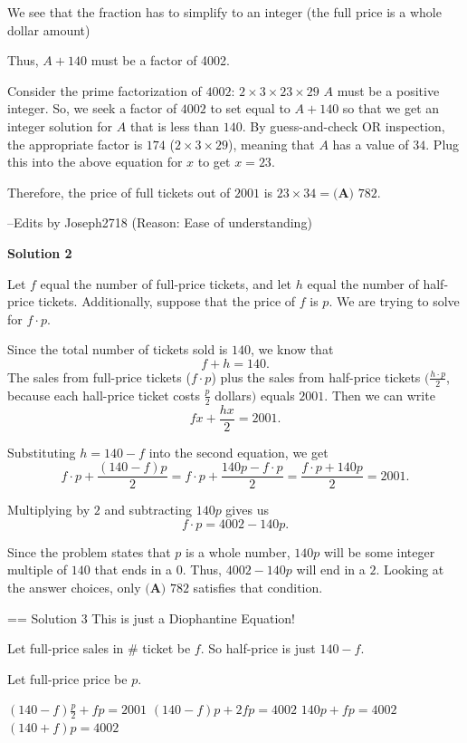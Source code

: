 \begin{enumerate}
 We see that the fraction has to simplify to an integer (the full price is a whole dollar amount)

 Thus, $A+140$ must be a factor of 4002.

 Consider the prime factorization of $4002$: $2\times3\times23\times29$
$A$ must be a positive integer. So, we seek a factor of $4002$ to set equal to $A+140$ so that we get an integer solution for $A$ that is less than $140$. By guess-and-check OR inspection, the appropriate factor is $174$ ($2\times3\times29$), meaning that $A$ has a value of $34$. Plug this into the above equation for $x$ to get $x = 23$.

 Therefore, the price of full tickets out of $2001$ is $23\times34=\boxed{\textbf{(A) }782}$.

 --Edits by Joseph2718 (Reason: Ease of understanding)

 



\textbf{Solution 2}

Let $f$ equal the number of full-price tickets, and let $h$ equal the number of half-price tickets. Additionally, suppose that the price of $f$ is $p$. We are trying to solve for $f \cdot p$.

 Since the total number of tickets sold is $140$, we know that 
 \[f+h=140.\] The sales from full-price tickets ($f \cdot p$) plus the sales from half-price tickets $\Big(\frac{h \cdot p}{2}$, because each hall-price ticket costs $\frac{p}{2}$ dollars$\Big)$ equals $2001.$ Then we can write 
 \[fx + \frac{hx}{2}=2001.\]

 Substituting $h=140-f$ into the second equation, we get 
 \[f \cdot p +\frac{(140-f)p}{2}=f \cdot p+\frac{140p-f\cdot p}{2}=\frac{f\cdot p+140p}{2}=2001.\]

 Multiplying by $2$ and subtracting $140p$ gives us 
 \[f\cdot p=4002-140p.\] 

 Since the problem states that $p$ is a whole number, $140p$ will be some integer multiple of $140$ that ends in a $0$. Thus, $4002-140p$ will end in a $2$. Looking at the answer choices, only $\boxed{\textbf{(A) }782}$ satisfies that condition.

 == Solution 3 This is just a Diophantine Equation!

 Let full-price sales in \# ticket be $f$.  So half-price is just $140-f$.

 Let full-price price be $p$.

 $(140-f)\frac p2+fp=2001$
$(140-f)p+2fp=4002$
$140p+fp=4002$
$(140+f)p=4002$


\end{enumerate}
